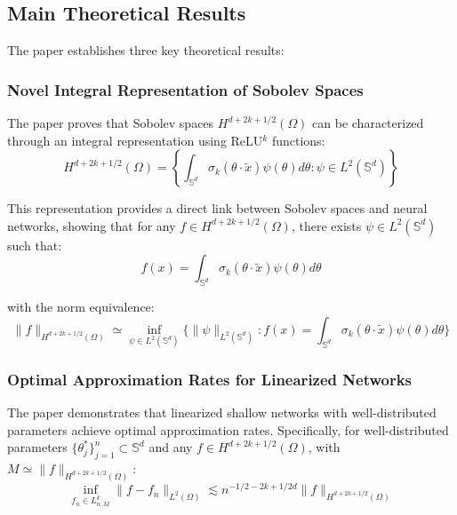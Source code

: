 \documentclass[11pt]{article}
\begin{document}
\subsection{Main Theoretical Results}

The paper establishes three key theoretical results:

\subsubsection{Novel Integral Representation of Sobolev Spaces}

The paper proves that Sobolev spaces $H^{d+2k+1/2}(\Omega)$ can be characterized through an integral representation using ReLU$^k$ functions:
\begin{equation}
H^{d+2k+1/2}(\Omega) = \left\{\int_{\mathbb{S}^d} \sigma_k(\theta \cdot \tilde{x}) \psi(\theta) d\theta : \psi \in L^2(\mathbb{S}^d) \right\}
\end{equation}

This representation provides a direct link between Sobolev spaces and neural networks, showing that for any $f \in H^{d+2k+1/2}(\Omega)$, there exists $\psi \in L^2(\mathbb{S}^d)$ such that:
\begin{equation}
f(x) = \int_{\mathbb{S}^d} \sigma_k(\theta \cdot \tilde{x}) \psi(\theta) d\theta
\end{equation}

with the norm equivalence:
\begin{equation}
\|f\|_{H^{d+2k+1/2}(\Omega)} \simeq \inf_{\psi \in L^2(\mathbb{S}^d)} \{\|\psi\|_{L^2(\mathbb{S}^d)} : f(x) = \int_{\mathbb{S}^d} \sigma_k(\theta \cdot \tilde{x}) \psi(\theta) d\theta\}
\end{equation}

\subsubsection{Optimal Approximation Rates for Linearized Networks}

The paper demonstrates that linearized shallow networks with well-distributed parameters achieve optimal approximation rates. Specifically, for well-distributed parameters $\{\theta_j^*\}_{j=1}^n \subset \mathbb{S}^d$ and any $f \in H^{d+2k+1/2}(\Omega)$, with $M \simeq \|f\|_{H^{d+2k+1/2}(\Omega)}$:
\begin{equation}
\inf_{f_n \in L_{n,M}^k} \|f - f_n\|_{L^2(\Omega)} \lesssim n^{-1/2-2k+1/2d} \|f\|_{H^{d+2k+1/2}(\Omega)}
\end{equation}
\end{document}
